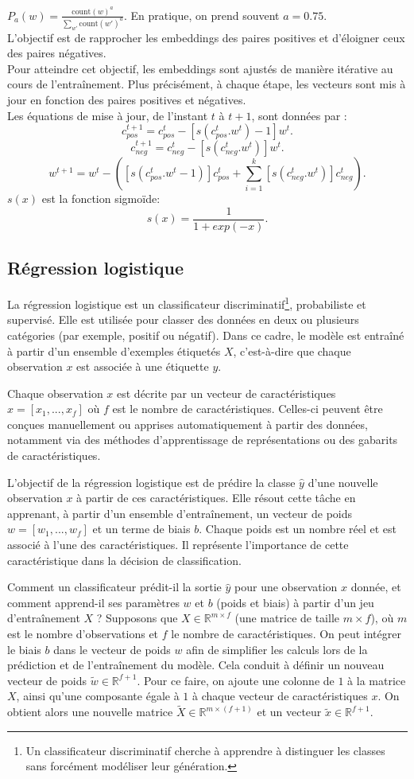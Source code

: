 \documentclass[12pt,a4paper]{report}
\begin{document}
	$P_a(w) = \frac{\text{count}(w)^a}{\sum_{w'} \text{count}(w')^a}$. En pratique, on prend souvent $a=0.75$.\\
	L’objectif est de rapprocher les embeddings des paires positives et d’éloigner ceux des paires négatives.\\
	Pour atteindre cet objectif, les embeddings sont ajustés de manière itérative au cours de l’entraînement. Plus précisément, à chaque étape, les vecteurs sont mis à jour en fonction des paires positives et négatives.\\
	Les équations de mise à jour, de l’instant $t$ à $t+1$, sont données par :
	\[
	c_{pos}^{t+1}=c_{pos}^t-[s(c_{pos}^t.w^t)-1]w^t.
	\]
	\[
	c_{neg}^{t+1}=c_{neg}^t-[s(c_{neg}^t.w^t)]w^t.
	\]
	\[
	w^{t+1}=w^t-([s(c_{pos}^t.w^t-1)]c_{pos}^t+\sum_{i=1}^{k}[s(c_{neg}^t.w^t)]c_{neg}^t).
	\]
	$s(x)$ est la fonction sigmoïde:
	\[
	s(x)=\frac{1}{1+exp(-x)}.
	\]
	\subsection{Régression logistique}
	
	La régression logistique est un classificateur discriminatif\footnote{Un classificateur discriminatif cherche à apprendre à distinguer les classes sans forcément modéliser leur génération.}, probabiliste et supervisé. Elle est utilisée pour classer des données en deux ou plusieurs catégories (par exemple, positif ou négatif). Dans ce cadre, le modèle est entraîné à partir d’un ensemble d’exemples étiquetés $X$, c’est-à-dire que chaque observation $x$ est associée à une étiquette $y$.

	Chaque observation $x$ est décrite par un vecteur de caractéristiques $x = [x_1, ..., x_f]$ où $f$ est le nombre de caractéristiques. Celles-ci peuvent être conçues manuellement ou apprises automatiquement à partir des données, notamment via des méthodes d’apprentissage de représentations ou des gabarits de caractéristiques.

	L’objectif de la régression logistique est de prédire la classe $\hat{y}$ d’une nouvelle observation $x$ à partir de ces caractéristiques. Elle résout cette tâche en apprenant, à partir d’un ensemble d’entraînement, un vecteur de poids $w = [w_1, ..., w_f]$ et un terme de biais $b$. Chaque poids est un nombre réel et est associé à l’une des caractéristiques. Il représente l'importance de cette caractéristique dans la décision de classification.
	
	Comment un classificateur prédit-il la sortie 
	$\hat{y}$ pour une observation $x$ donnée, et comment apprend-il ses paramètres $w$ et $b$ (poids et biais) à partir d’un jeu d’entraînement $X$ ?
	Supposons que $X \in \mathbb{R}^{m \times f}$ (une matrice de taille $m \times f$), où $m$ est le nombre d’observations et $f$ le nombre de caractéristiques. On peut intégrer le biais $b$ dans le vecteur de poids $w$ afin de simplifier les calculs lors de la prédiction et de l’entraînement du modèle. Cela conduit à définir un nouveau vecteur de poids $\tilde{w} \in \mathbb{R}^{f+1}$. Pour ce faire, on ajoute une colonne de $1$ à la matrice $X$, ainsi qu’une composante égale à $1$ à chaque vecteur de caractéristiques $x$. On obtient alors une nouvelle matrice  $\tilde{X} \in \mathbb{R}^{m \times (f+1)}$ et un vecteur $\tilde{x} \in \mathbb{R}^{f+1}$.
\end{document}
